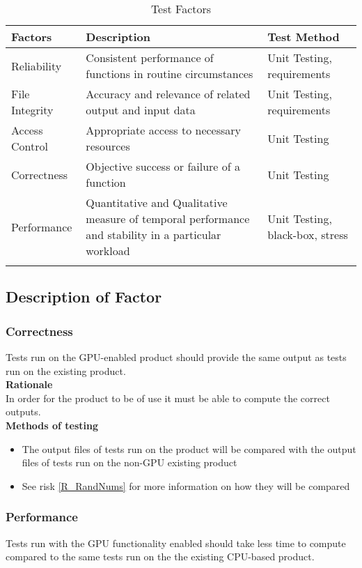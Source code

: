 \documentclass[12pt]{article}
\begin{document}
\begin{table}[h]
\centering
\caption{Test Factors}
\begin{tabular}{|l|l|l|}
\Xhline{2\arrayrulewidth}
\bf Factors & \bf Description & \bf Test Method\\\hline
Reliability & Consistent performance of functions in routine circumstances & Unit Testing, requirements\\
File Integrity & Accuracy and relevance of related output and input data & Unit Testing, requirements\\
Access Control & Appropriate access to necessary resources & Unit Testing\\
Correctness & Objective success or failure of a function & Unit Testing\\
Performance & Quantitative and Qualitative measure of temporal performance and stability in a particular workload & Unit Testing, black-box, stress\\
\Xhline{2\arrayrulewidth}
\end{tabular}
\end{table}

\subsection{Description of Factor} %
\subsubsection{Correctness}
Tests run on the GPU-enabled product should provide the same output as tests run on the existing product.\\

\textbf{Rationale}\\
In order for the product to be of use it must be able to compute the correct outputs.\\

\textbf{Methods of testing}
\begin{itemize}
\item The output files of tests run on the product will be compared with the output files of tests run on the non-GPU existing product
\item See risk \ref{R_RandNums} for more information on how they will be compared
\end{itemize}

\subsubsection{Performance}
Tests run with the GPU functionality enabled should take less time to compute compared to the same tests run on the the existing CPU-based product.\\
\end{document}
